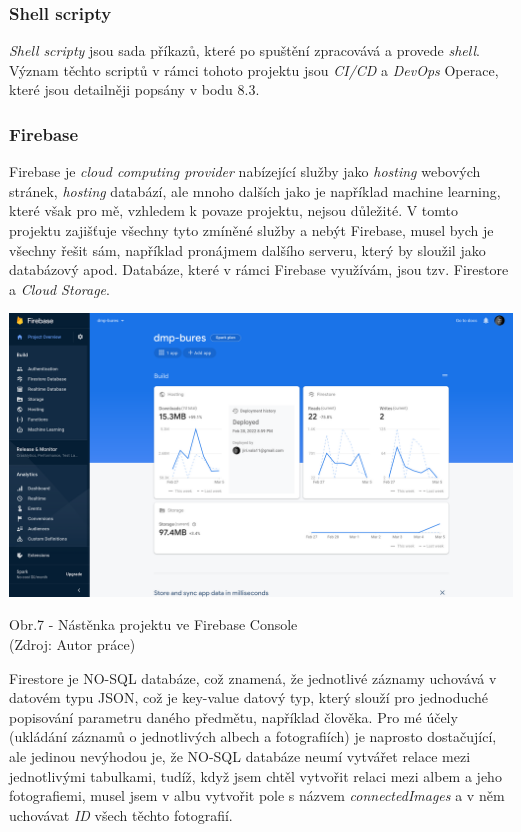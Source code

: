 \documentclass[12pt,a4paper]{report}
\begin{document}
  \subsubsection{Shell scripty}
  \emph{Shell} \emph{scripty} jsou sada příkazů, které po spuštění zpracovává a provede \emph{shell}. Význam těchto
  scriptů v rámci tohoto projektu jsou \emph{CI/CD} a \emph{DevOps} Operace, které jsou detailněji popsány v bodu 8.3.
  \subsubsection{Firebase}
  Firebase je \emph{cloud computing provider} nabízející služby jako \emph{hosting} webových stránek, \emph{hosting}
  databází, ale mnoho dalších jako je například machine learning, které však pro mě, vzhledem k
  povaze projektu, nejsou důležité. V tomto projektu zajišťuje všechny tyto zmíněné služby a nebýt
  Firebase, musel bych je všechny řešit sám, například pronájmem dalšího serveru, který by sloužil jako databázový apod.
  Databáze, které v rámci Firebase využívám, jsou tzv. Firestore a \emph{Cloud Storage}.

  \vspace*{0.5cm}
  \noindent\includegraphics[width=\linewidth]{firebaseDash.png}
  \begin{center}
    Obr.7 -  Nástěnka projektu ve Firebase Console \\
    (Zdroj: Autor práce)
  \end{center}
  Firestore je NO-SQL databáze, což znamená, že jednotlivé záznamy uchovává v datovém typu
  JSON, což je key-value datový typ, který slouží pro jednoduché popisování parametru daného
  předmětu, například člověka. Pro mé účely (ukládání záznamů o jednotlivých albech a fotografiích)
  je naprosto dostačující, ale jedinou nevýhodou je, že NO-SQL databáze neumí vytvářet relace
  mezi jednotlivými tabulkami, tudíž, když jsem chtěl vytvořit relaci mezi albem a jeho fotografiemi,
  musel jsem v albu vytvořit pole s názvem \emph{connectedImages} a v něm uchovávat \emph{ID} všech těchto
  fotografií.
\end{document}
